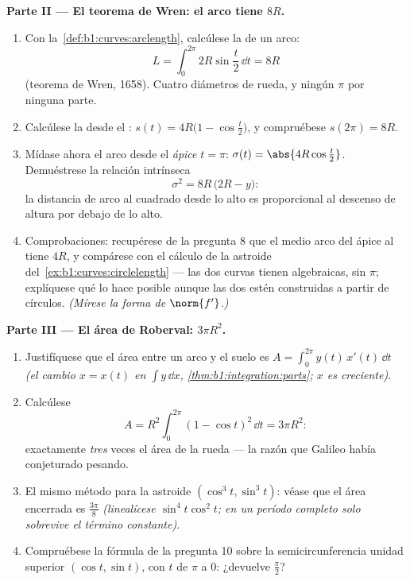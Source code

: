 \begin{problem}
\medskip
\noindent\textbf{Parte II --- El teorema de Wren: el arco tiene
 $8R$.}
\begin{enumerate}[resume]
  \item Con la~\cref{def:b1:curves:arclength}, calcúlese la
         de un arco:
        \[
        L = \int_0^{2\pi} 2R\sin\frac t2\,\dd t = 8R
        \]
        (teorema de Wren, 1658). Cuatro diámetros de rueda, y
        ningún $\pi$ por ninguna parte.
  \item Calcúlese la  desde el
        : $s(t) = 4R\bigl(1 - \cos\frac t2\bigr)$,
        y compruébese $s(2\pi) = 8R$.
  \item Mídase ahora el arco desde el \emph{ápice} $t = \pi$:
        $\sigma(t) = \abs{4R\cos\frac t2}$. Demuéstrese la relación
        intrínseca
        \[
        \sigma^2 = 8R\,\bigl(2R - y\bigr) :
        \]
        la distancia de arco al cuadrado desde lo alto es
        proporcional al descenso de altura por debajo de lo alto.
  \item Comprobaciones: recupérese de la pregunta 8 que el medio
        arco del ápice al  tiene  $4R$, y
        compárese con el cálculo de la astroide
        del~\cref{ex:b1:curves:circlelength} --- las dos curvas
        tienen  algebraicas, sin $\pi$; explíquese qué lo
        hace posible aunque las dos estén construidas a partir de
        círculos. \emph{(Mírese la forma de $\norm{f'}$.)}
\end{enumerate}

\medskip
\noindent\textbf{Parte III --- El área de Roberval: $3\pi R^2$.}
\begin{enumerate}[resume]
  \item Justifíquese que el área entre un arco y el suelo es
        $A = \int_0^{2\pi} y(t)\,x'(t)\,\dd t$ \emph{(el cambio
        $x = x(t)$ en $\int y\,\dd x$,
        \cref{thm:b1:integration:parts}; $x$ es creciente)}.
  \item Calcúlese
        \[
        A = R^2\int_0^{2\pi}(1 - \cos t)^2\,\dd t = 3\pi R^2 :
        \]
        exactamente \emph{tres} veces el área de la rueda --- la
        razón que Galileo había conjeturado pesando.
  \item El mismo método para la astroide $(\cos^3t, \sin^3t)$:
        véase que el área encerrada es $\frac{3\pi}8$
        \emph{(linealícese $\sin^4 t\cos^2 t$; en un período
        completo solo sobrevive el término constante)}.
  \item Compruébese la fórmula de la pregunta 10 sobre la
        semicircunferencia unidad superior $(\cos t, \sin t)$, con
        $t$ de $\pi$ a $0$: ¿devuelve $\frac\pi2$?
\end{enumerate}


\end{problem}
